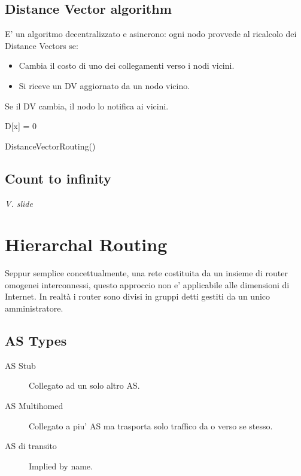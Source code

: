 \subsection{Distance Vector algorithm}
E' un algoritmo decentralizzato e asincrono: ogni nodo provvede al ricalcolo dei Distance Vectors se:
\begin{itemize}
    \item Cambia il costo di uno dei collegamenti verso i nodi vicini.
    \item Si riceve un DV aggiornato da un nodo vicino.
\end{itemize}
Se il DV cambia, il nodo lo notifica ai vicini.
\begin{algorithm*}
     {
    }
    D[x] = 0\\
    \caption{DistanceVectorRouting()}
\end{algorithm*}
\subsection{Count to infinity}
\textit{\small V. slide}
\section{Hierarchal Routing}
Seppur semplice concettualmente, una rete costituita da un insieme di router omogenei interconnessi, questo approccio non e' applicabile alle dimensioni di Internet.
In realtà i router sono divisi in gruppi detti  gestiti da un unico amministratore.
\subsection{AS Types}
\begin{description}
    \item[AS Stub] Collegato ad un solo altro AS.
    \item[AS Multihomed] Collegato a piu' AS ma trasporta solo traffico da o verso se stesso.
    \item[AS di transito] Implied by name.   
\end{description}
